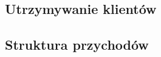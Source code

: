 \documentclass[12pt]{article}
\begin{document}

\subsection{Utrzymywanie klientów}



\subsection{Struktura przychodów}



\end{document}
